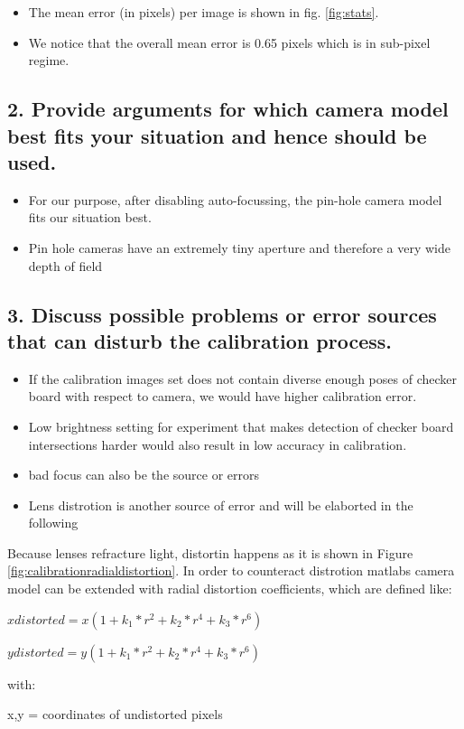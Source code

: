 \begin{itemize}
\item The mean error (in pixels) per image is shown in fig. \ref{fig:stats}.
\item We notice that the overall mean error is 0.65 pixels which is in sub-pixel regime.
\end{itemize}
\subsection*{2. Provide arguments for which camera model best fits your situation and hence should be used.}
\begin{itemize}
\item For our purpose, after disabling auto-focussing, the pin-hole camera model fits our situation best.
\item Pin hole cameras have an extremely tiny aperture and therefore a very wide depth of field
\end{itemize}

\subsection*{3. Discuss possible problems or error sources that can disturb the calibration process.}
\begin{itemize}
\item If the calibration images set does not contain diverse enough poses of checker board with respect to camera, we would have higher calibration error.
\item Low brightness setting for experiment that makes detection of checker board intersections harder would also result in low accuracy in calibration.
\item  bad focus can also be the source or errors
\item Lens distrotion is another source of error and will be elaborted in the following
\end{itemize}

Because lenses refracture light, distortin happens as it is shown in Figure \ref{fig:calibrationradialdistortion}. 
In order to counteract distrotion matlabs camera model can be extended with radial distortion coefficients, which are defined like:


$xdistorted = x(1 + k_1*r^2 + k_2*r^4 + k_3*r^6)$

$ydistorted= y(1 + k_1*r^2 + k_2*r^4 + k_3*r^6) $


with:

x,y = coordinates of undistorted pixels

